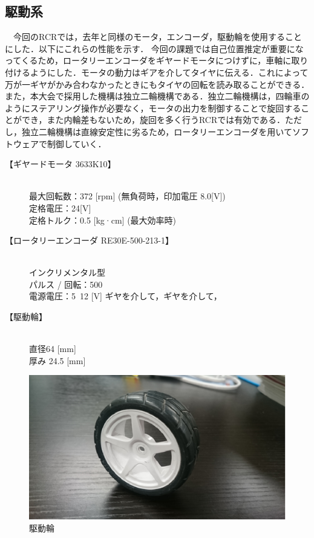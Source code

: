 \documentclass[10pt,a4j]{jarticle}
\begin{document}
\subsection{駆動系}
　今回のRCRでは，去年と同様のモータ，エンコーダ，駆動輪を使用することにした．以下にこれらの性能を示す．
今回の課題では自己位置推定が重要になってくるため，ロータリーエンコーダをギヤードモータにつけずに，車軸に取り付けるようにした．モータの動力はギアを介してタイヤに伝える．これによって万が一ギヤがかみ合わなかったときにもタイヤの回転を読み取ることができる．
また，本大会で採用した機構は独立二輪機構である．独立二輪機構は，四輪車のようにステアリング操作が必要なく，モータの出力を制御することで旋回することができ，また内輪差もないため，旋回を多く行うRCRでは有効である．ただし，独立二輪機構は直線安定性に劣るため，ロータリーエンコーダを用いてソフトウェアで制御していく．

\begin{description}
 \item[【ギヤードモータ 3633K10】] \mbox{} \\ 
	    最大回転数：372 [rpm] (無負荷時，印加電圧 8.0[V]) \\
	    定格電圧：24[V] \\
	    定格トルク：0.5 [kg·cm] (最大効率時)        
 \item[【ロータリーエンコーダ RE30E-500-213-1】] \mbox{} \\
	    インクリメンタル型 \\
	    パルス / 回転：500 \\
	    電源電圧：5~12 [V] ギヤを介して，ギヤを介して，
 \item[【駆動輪】] \mbox{} \\
	    直径64 [mm] \\
	    厚み 24.5 [mm]
\end{description}


\begin{figure}[b]
 \begin{center}
  \includegraphics[scale=.5]{./picture/picture1.eps}
  \caption{駆動輪}
 \end{center}
\end{figure}
\end{document}
